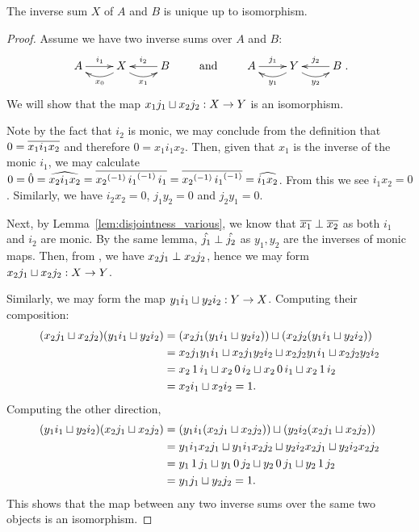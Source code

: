 \begin{lemma}\label{lem:inverse_sum_is_unique}
  The inverse sum $X$ of $A$ and $B$ is unique up to isomorphism.
\end{lemma}
\begin{proof}
  Assume we have two inverse sums over $A$ and $B$:
  \[
    \xymatrix{
      A\ar[r]^{i_1} &X\ar@/^9pt/[l]^{x_0} \ar@/_9pt/[r]_{x_1} & B \ar[l]_{i_2}
    }
    \qquad  \text{ and  }\qquad
    \xymatrix{
      A\ar[r]^{\jay_1} &Y\ar@/^9pt/[l]^{y_1} \ar@/_9pt/[r]_{y_2} & B \ar[l]_{\jay_2}
    }.
  \]
  We will show that the map $x_1 j_1 \sqcup x_2 j_2 : X \to Y$ is an isomorphism.

  Note by the fact that $i_2$ is monic, we may conclude from the definition that
  $0 = \overline{x_1 i_1 x_2}$ and therefore $0 = x_1 i_1 x_2$. Then, given that $x_1$ is the inverse
  of the monic $i_1$, we may calculate
  $0 = \hat{0} = \widehat{x_2 i_1 x_2} = \overline{{x_2}^{(-1)}\, {i_1}^{(-1)}\, i_1} =
  \overline{{x_2}^{(-1)}\, {i_1}^{(-1)}} = \widehat{i_1 x_2}$. From this we see $i_1 x_2 = 0$. Similarly, we have
  $i_2 x_2 = 0$, $j_1 y_2 =0$ and $j_2 y_1 = 0$.

  Next, by Lemma~\ref{lem:disjointness_various}, we know that $\overline{x_1}\perp\overline{x_2}$ as both
  $i_1$ and $i_2$ are monic. By the same lemma, $\hat{j_1} \perp \hat{j_2}$ as $y_1, y_2$
  are the inverses of monic maps.  Then, from , we have
  $x_2 j_1 \perp x_2 j_2$, hence we may form $x_2 j_1 \sqcup x_2 j_2 : X \to Y$.

  Similarly, we may form the map $y_1 i_1 \sqcup y_2 i_2 : Y \to X$. Computing their composition:
  \begin{align*}
    (x_2 j_1 \sqcup x_2 j_2)(y_1 i_1 \sqcup y_2 i_2)
      &= (x_2 j_1 (y_1 i_1 \sqcup y_2 i_2))\sqcup (x_2 j_2(y_1 i_1 \sqcup y_2 i_2))\\
      &= x_2 j_1 y_1 i_1 \sqcup x_2 j_1 y_2 i_2 \sqcup x_2 j_2 y_1 i_1 \sqcup x_2
        j_2 y_2 i_2 \\
      &= x_2\, 1\, i_1 \sqcup x_2\, 0\, i_2 \sqcup x_2\, 0\, i_1 \sqcup x_2\, 1\, i_2\\
      &= x_2 i_1 \sqcup x_2 i_2 = 1.
  \end{align*}
  Computing the other direction,
  \begin{align*}
    (y_1 i_1 \sqcup y_2 i_2)(x_2 j_1 \sqcup x_2 j_2)
      &= (y_1 i_1 (x_2 j_1 \sqcup x_2 j_2) )\sqcup (y_2 i_2(x_2 j_1 \sqcup x_2 j_2))\\
      &= y_1 i_1 x_2 j_1 \sqcup y_1 i_1 x_2 j_2 \sqcup y_2 i_2 x_2 j_1
        \sqcup y_2 i_2 x_2 j_2\\
      &= y_1\, 1\, j_1 \sqcup y_1\, 0\, j_2 \sqcup y_2\, 0\, j_1 \sqcup y_2\, 1\, j_2\\
      &= y_1 j_1 \sqcup y_2 j_2 = 1.\\
  \end{align*}
  This shows that the map between any two inverse sums over the same two objects is an isomorphism.
\end{proof}

